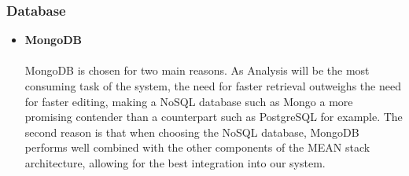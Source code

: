 \documentclass[12pt]{article}
\begin{document}
		\subsubsection{Database}
		
		\begin{itemize}
			\item \textbf{MongoDB}\\\\
			MongoDB is chosen for two main reasons. As Analysis will be the most consuming task of the system, the need for faster retrieval outweighs the need for faster editing, making a NoSQL database such as Mongo a more promising contender than a counterpart such as PostgreSQL for example. The second reason is that when choosing the NoSQL database, MongoDB performs well combined with the other components of the MEAN stack architecture, allowing for the best integration into our system.
		\end{itemize}
		
\end{document}
